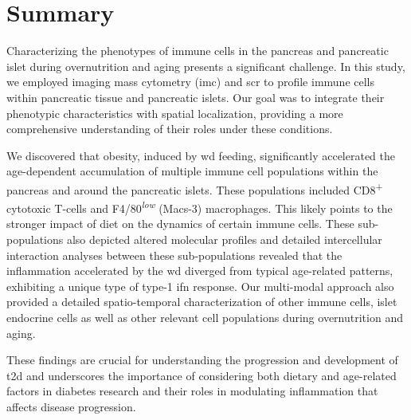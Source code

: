 \clearpage

\section[Summary]{Summary}
\label{sec:chp2_summary}

\par Characterizing the phenotypes of immune cells in the pancreas and pancreatic islet during overnutrition and aging presents a significant challenge. In this study, we employed imaging mass cytometry (\gls{imc}) and \acrfull{scr} to profile immune cells within pancreatic tissue and pancreatic islets. Our goal was to integrate their phenotypic characteristics with spatial localization, providing a more comprehensive understanding of their roles under these conditions.\\
\par We discovered that obesity, induced by \acrfull{wd} feeding, significantly accelerated the age-dependent accumulation of multiple immune cell populations within the pancreas and around the pancreatic islets. These populations included CD8\textsuperscript{+} cytotoxic T-cells and F4/80\textsuperscript{\textit{low}} (Macs-3) macrophages. This likely points to the stronger impact of diet on the dynamics of certain immune cells. These sub-populations also depicted altered molecular profiles and detailed intercellular interaction analyses between these sub-populations revealed that the inflammation accelerated by the \gls{wd} diverged from typical age-related patterns, exhibiting a unique type of type-1 \acrfull{ifn} response. Our multi-modal approach also provided a detailed spatio-temporal characterization of other immune cells, islet endocrine cells as well as other relevant cell populations during overnutrition and aging.\\
\par These findings are crucial for understanding the progression and development of \gls{t2d} and underscores the importance of considering both dietary and age-related factors in diabetes research and their roles in modulating inflammation that affects disease progression.


